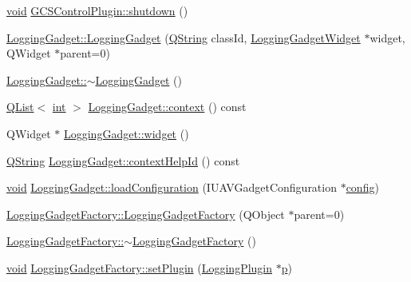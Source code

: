 \begin{DoxyCompactItemize}
\item 
\hyperlink{group___u_a_v_objects_plugin_ga444cf2ff3f0ecbe028adce838d373f5c}{void} \hyperlink{group___g_c_s_control_gadget_plugin_ga4c6e2d64333994bacf7db3c918057799}{G\-C\-S\-Control\-Plugin\-::shutdown} ()
\item 
\hyperlink{group___g_c_s_control_gadget_plugin_gaf04a39f8faf77df7657801a58bf39bf9}{Logging\-Gadget\-::\-Logging\-Gadget} (\hyperlink{group___u_a_v_objects_plugin_gab9d252f49c333c94a72f97ce3105a32d}{Q\-String} class\-Id, \hyperlink{class_logging_gadget_widget}{Logging\-Gadget\-Widget} $\ast$widget, Q\-Widget $\ast$parent=0)
\item 
\hyperlink{group___g_c_s_control_gadget_plugin_gabcd5577c6960598473ac23935c47c958}{Logging\-Gadget\-::$\sim$\-Logging\-Gadget} ()
\item 
\hyperlink{class_q_list}{Q\-List}$<$ \hyperlink{ioapi_8h_a787fa3cf048117ba7123753c1e74fcd6}{int} $>$ \hyperlink{group___g_c_s_control_gadget_plugin_gadceb403447b87bafeda8fad2855d01bf}{Logging\-Gadget\-::context} () const 
\item 
Q\-Widget $\ast$ \hyperlink{group___g_c_s_control_gadget_plugin_gaaa54cb505c0bcf94b159b6fb51cea991}{Logging\-Gadget\-::widget} ()
\item 
\hyperlink{group___u_a_v_objects_plugin_gab9d252f49c333c94a72f97ce3105a32d}{Q\-String} \hyperlink{group___g_c_s_control_gadget_plugin_gaf63d806b2f5ac3cdf4c71fe9a241f7a8}{Logging\-Gadget\-::context\-Help\-Id} () const 
\item 
\hyperlink{group___u_a_v_objects_plugin_ga444cf2ff3f0ecbe028adce838d373f5c}{void} \hyperlink{group___g_c_s_control_gadget_plugin_ga7e66a1250e46435b2c92ff170afafeec}{Logging\-Gadget\-::load\-Configuration} (I\-U\-A\-V\-Gadget\-Configuration $\ast$\hyperlink{deflate_8c_a4473b5227787415097004fd39f55185e}{config})
\item 
\hyperlink{group___g_c_s_control_gadget_plugin_gaef9e98419a7dd5551cd13876c2c4b357}{Logging\-Gadget\-Factory\-::\-Logging\-Gadget\-Factory} (Q\-Object $\ast$parent=0)
\item 
\hyperlink{group___g_c_s_control_gadget_plugin_ga6ddd468f9f7b722281dc55df5d991dc1}{Logging\-Gadget\-Factory\-::$\sim$\-Logging\-Gadget\-Factory} ()
\item 
\hyperlink{group___u_a_v_objects_plugin_ga444cf2ff3f0ecbe028adce838d373f5c}{void} \hyperlink{group___g_c_s_control_gadget_plugin_ga00c5e0af9d177e7d271c0d6dcd6f4601}{Logging\-Gadget\-Factory\-::set\-Plugin} (\hyperlink{class_logging_plugin}{Logging\-Plugin} $\ast$\hyperlink{glext_8h_aa5367c14d90f462230c2611b81b41d23}{p})

\end{DoxyCompactItemize}
